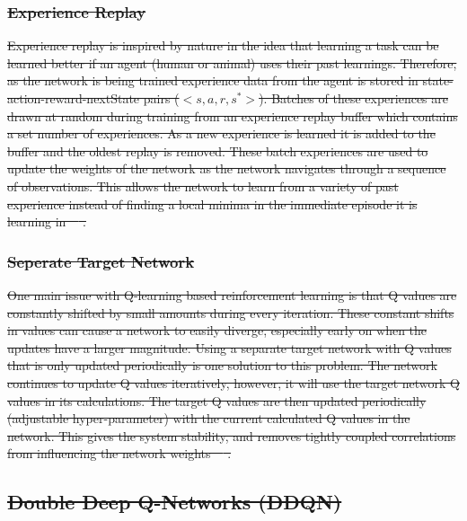 \documentclass[12pt,american]{report}
\providecommand{\DIFdeltex}[1]{{\protect\color{red}\sout{#1}}}                      %
\providecommand{\DIFdel}[1]{\texorpdfstring{\DIFdeltex{#1}}{}} %
\begin{document}
\subsubsection{\DIFdel{Experience Replay}}
\addtocounter{subsubsection}{-1}%

\DIFdel{Experience replay is inspired by nature in the idea that learning a task can be learned better if an agent (human or animal) uses their past learnings.  Therefore, as the network is being trained experience data from the agent is stored in state-action-reward-nextState pairs ($<s,a,r,s^{*}>$). Batches of these experiences are drawn at random during training from an experience replay buffer which contains a set number of experiences.  As a new experience is learned it is added to the buffer and the oldest replay is removed. These batch experiences are used to update the weights of the network as the network navigates through a sequence of observations.  This allows the network to learn from a variety of past experience instead of finding a local minima in the immediate episode it is learning in~\mbox{%
\cite{atari}}%
.
}%

\subsubsection{\DIFdel{Seperate Target Network}}
\addtocounter{subsubsection}{-1}%

\DIFdel{One main issue with Q-learning based reinforcement learning is that Q values are constantly shifted by small amounts during every iteration.  These constant shifts in values can cause a network to easily diverge, especially early on when the updates have a larger magnitude.  Using a separate target network with Q values that is only updated periodically is one solution to this problem.  The network continues to update Q values iteratively, however, it will use the target network Q values in its calculations.  The target Q values are then updated periodically (adjustable hyper-parameter) with the current calculated Q values in the network.  This gives the system stability, and removes tightly coupled correlations from influencing the network weights~\mbox{%
\cite{atari}}%
.
}%

\subsection{\DIFdel{Double Deep Q-Networks (DDQN)}}
\addtocounter{subsection}{-1}%
\end{document}
